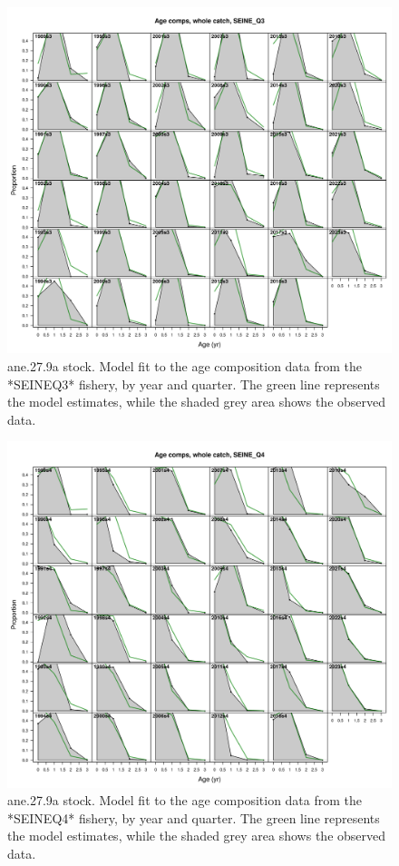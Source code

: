 \documentclass[
]{article}
\begin{document}
\begin{figure}[H]

{\centering \includegraphics[width=0.95\linewidth]{report/run/S1.0_4FLEETS/fig_age_fit_SeineQ3} 

}

\caption{ane.27.9a stock. Model fit to the age composition data from the *SEINEQ3* fishery, by year and quarter. The green line represents the model estimates, while the shaded grey area shows the observed data.}\label{fig:unnamed-chunk-21}
\end{figure}

\begin{figure}[H]

{\centering \includegraphics[width=0.95\linewidth]{report/run/S1.0_4FLEETS/fig_age_fit_SeineQ4} 

}

\caption{ane.27.9a stock. Model fit to the age composition data from the *SEINEQ4* fishery, by year and quarter. The green line represents the model estimates, while the shaded grey area shows the observed data.}\label{fig:unnamed-chunk-22}
\end{figure}
\end{document}
